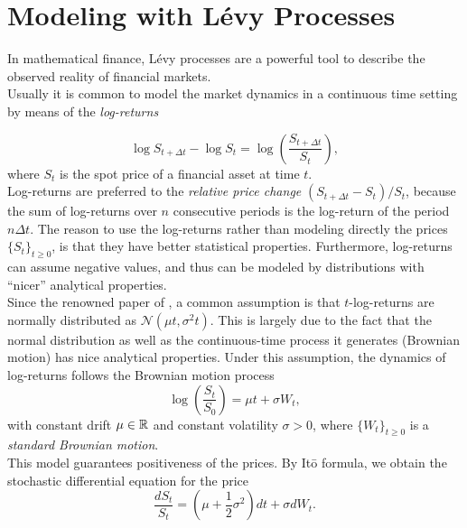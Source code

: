 

\chapter{Modeling with Lévy Processes}\label{Chapter1}
\minitoc%


\vspace{5em}

In mathematical finance, Lévy processes are a powerful tool to describe the observed reality of financial markets.\\ 
Usually it is common to model the market dynamics in a continuous time setting by means of the \emph{log-returns}

\begin{equation}
 \log S_{t+\Delta t} - \log S_t = \log \left(\frac{S_{t+\Delta t}}{S_t}\right),
\end{equation}
where $S_t$ is the spot price of a financial asset at time $t$.\\
Log-returns are preferred to the \emph{relative price change} $(S_{t+\Delta t} - S_t )/S_t$, because the sum of log-returns 
over $n$ consecutive periods is the log-return of the period $n \Delta t$.
The reason to use the log-returns rather than modeling directly the prices $\{S_t\}_{t \geq0}$, is that they have better statistical properties.
Furthermore, log-returns can assume negative values, and thus can be modeled by distributions
with ``nicer'' analytical properties.\\
Since the renowned paper of \cite{BS73}, a common assumption is that $t$-log-returns are 
normally distributed as $\mathcal{N}(\mu t,\sigma^2 t)$. 
This is largely due to the fact that the normal distribution as well as the continuous-time process
it generates (Brownian motion) has nice analytical properties.
Under this assumption, the dynamics  of log-returns follows the Brownian motion process
\begin{equation}\label{GBM}
 \log \left( \frac{S_t}{S_0} \right) = \mu t + \sigma W_t ,
\end{equation}
with constant drift $\mu \in \mathbb{R}$ and constant volatility $\sigma >0$, where $\{W_t\}_{t \geq0}$ is a \emph{standard Brownian motion}.\\
This model guarantees positiveness of the prices. By It\={o} formula, we obtain the stochastic differential equation for the price
\begin{equation}\label{GBM_sde}
 \frac{d S_t}{S_t} = (\mu + \frac{1}{2} \sigma^2) d t + \sigma dW_t  .
\end{equation}
